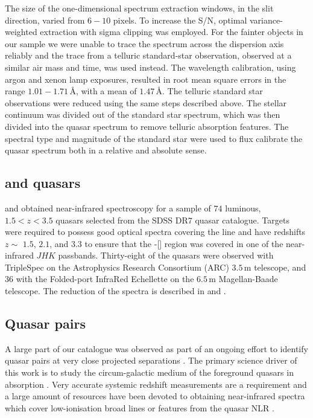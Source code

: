 The size of the one-dimensional spectrum extraction windows, in the slit direction, varied from $6-10$ pixels. 
To increase the S/N, optimal variance-weighted extraction with sigma clipping was employed. 
For the fainter objects in our sample we were unable to trace the spectrum across the dispersion axis reliably and the trace from a telluric standard-star observation, observed at a similar air mass and time, was used instead. 
The wavelength calibration, using argon and xenon lamp exposures, resulted in root mean square errors in the range $1.01-1.71$\,\AA, with a mean of $1.47$\,\AA. 
The telluric standard star observations were reduced using the same steps described above. 
The stellar continuum was divided out of the standard star spectrum, which was then divided into the quasar spectrum to remove telluric absorption features. 
The spectral type and magnitude of the standard star were used to flux calibrate the quasar spectrum both in a relative and absolute sense.

\subsection{\citet{shen12} and \citet{shen16a} quasars}

\citet{shen16a} and \citet{shen12} obtained near-infrared spectroscopy for a sample of $74$ luminous, $1.5 < z < 3.5$ quasars selected from the SDSS DR$7$ quasar catalogue. 
Targets were required to possess good optical spectra covering the  line and have redshifts $z\sim$ $1.5$, $2.1$, and $3.3$ to ensure that the \hbns-[] region was covered in one of the near-infrared $JHK$ passbands.
Thirty-eight of the quasars were observed with TripleSpec \citep{wilson04} on the Astrophysics Research Consortium (ARC) $3.5$\,m telescope, and $36$ with the Folded-port InfraRed Echellette \citep[FIRE;][]{simcoe10} on the $6.5$\,m Magellan-Baade telescope.
The reduction of the spectra is described in \citet{shen16a} and \citet{shen12}. 

\subsection{Quasar pairs}

A large part of our catalogue was observed as part of an ongoing effort to identify quasar pairs at very close projected separations \citep[Quasars Probing Quasars\footnote{www.ucolick.org/\textasciitilde xavier/QPQ/Quasars\_Probing\_Quasars};][]{hennawi06a,hennawi10}. 
The primary science driver of this work is to study the circum-galactic medium of the foreground quasars in absorption \citep{hennawi06b}.
Very accurate systemic redshift measurements are a requirement and a large amount of resources have been devoted to obtaining near-infrared spectra which cover low-ionisation broad lines or features from the quasar NLR \citep{prochaska09,lau16,hennawi15}. 

